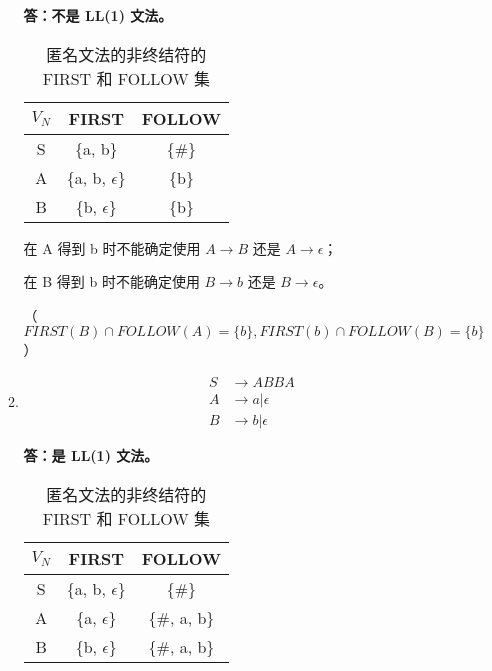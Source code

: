 \begin{enumerate}
\begin{enumerate}
        \textbf{答：不是 LL(1) 文法。}
        
        \begin{table}[H]
            \centering
            \begin{tabular}{|c|c|c|}
                \hline
                $V_N$ & FIRST & FOLLOW \\
                \hline
                S & \{a, b\} & \{\#\} \\
                \hline
                A & \{a, b, $\epsilon$\} & \{b\} \\
                \hline
                B & \{b, $\epsilon$\} & \{b\} \\
                \hline
            \end{tabular}
            \caption{匿名文法的非终结符的 FIRST 和 FOLLOW 集}
            \label{tab:FF3_2}
        \end{table}
        
        在 A 得到 b 时不能确定使用 $A \to B$ 还是 $A \to \epsilon$；
        
        在 B 得到 b 时不能确定使用 $B \to b$ 还是 $B \to \epsilon$。
        
        （$FIRST(B) \cap FOLLOW(A) = \{b\}, FIRST(b) \cap FOLLOW(B) = \{b\} $）
        
        \item \begin{align*}
            S & \to ABBA \\
            A & \to a | \epsilon \\
            B & \to b | \epsilon
        \end{align*}
        
        \textbf{答：是 LL(1) 文法。}
        
        \begin{table}[H]
            \centering
            \begin{tabular}{|c|c|c|}
                \hline
                $V_N$ & FIRST & FOLLOW \\
                \hline
                S & \{a, b, $\epsilon$\} & \{\#\} \\
                \hline
                A & \{a, $\epsilon$\} & \{\#, a, b\} \\
                \hline
                B & \{b, $\epsilon$\} & \{\#, a, b\} \\
                \hline
            \end{tabular}
            \caption{匿名文法的非终结符的 FIRST 和 FOLLOW 集}
            \label{tab:FF3_3}
        \end{table}
        

\end{enumerate}
\end{enumerate}
